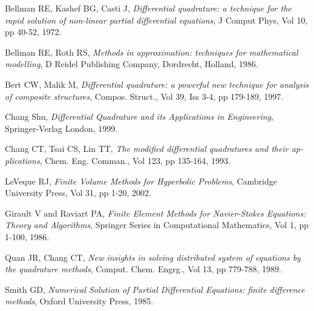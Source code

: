 \documentclass{arabicClass}
\begin{document}
	
	\renewcommand{\theequation}{\arabic{equation}.\arabic{chapter}}
	
	\renewcommand{\arraystretch}{1.3}
	
	\abovedisplayskip=7pt
	\belowdisplayskip=7pt
	
	
	
	
	
		\tableofcontents
		\clearpage
	
	
	
	
	
	
	
	
	

	
\begin{thebibliography}{99}
	\begin{english}
		Bellman RE, Kashef BG, Casti J, \textit{Differential quadrature: a technique for the rapid solution of non-linear partial differential equations}, J Comput Phys, Vol 10, pp 40-52, 1972.
		
		Bellman RE, Roth RS, \textit{Methods in approximation: techniques for mathematical modelling}, D Reidel Publishing Company, Dordrecht, Holland, 1986.
		
		Bert CW, Malik M, \textit{Differential quadrature: a powerful new technique for analysis of composite structures}, Compos. Struct., Vol 39, Iss 3-4, pp 179-189, 1997.
		
		Chang Shu, \textit{Differential Quadrature and its Applications in Engineering}, Springer-Verlag London, 1999.
		
		Chang CT, Tsai CS, Lin TT, \textit{The modified differential quadratures and their applications}, Chem. Eng. Comman., Vol 123, pp 135-164, 1993.
		
		LeVeque RJ, \textit{Finite Volume Methods for Hyperbolic Problems}, Cambridge University Press, Vol 31, pp 1-20, 2002.
		
		Girault V and Raviart PA, \textit{Finite Element Methods for Navier-Stokes Equations: Theory and Algorithms}, Springer Series in Computational Mathematics, Vol 1, pp 1-100, 1986.
		
		Quan JR, Chang CT, \textit{New insights in solving distributed system of equations by the quadrature methods}, Comput. Chem. Engrg., Vol 13, pp 779-788, 1989.
		
		Smith GD, \textit{Numerical Solution of Partial Differential Equations: finite difference methods}, Oxford University Press, 1985.
		\end{english}
\end{thebibliography}


	
\end{document}

